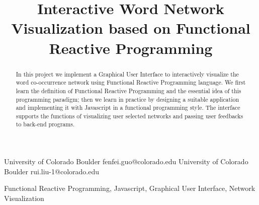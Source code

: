 \documentclass[]{sigplanconf}
\begin{document}
\setlength{\pdfpageheight}{\paperheight}
\setlength{\pdfpagewidth}{\paperwidth}




\title{Interactive Word Network Visualization based on Functional Reactive Programming}

           {University of Colorado Boulder}
           {fenfei.guo@colorado.edu}
           {University of Colorado Boulder}
           {rui.liu-1@colorado.edu}

\maketitle

\begin{abstract}
In this project we implement a Graphical User Interface to interactively visualize the word co-occurrence network using Functional Reactive Programming language. We first learn the definition of Functional Reactive Programming and the essential idea of this programming paradigm; then we learn in practice by designing a suitable application and implementing it with Javascript in a functional programming style. The interface supports the functions of visualizing user selected networks and passing user feedbacks to back-end programs. 
\end{abstract}


\keywords
Functional Reactive Programming, Javascript, Graphical User Interface, Network Visualization
















\end{document}
